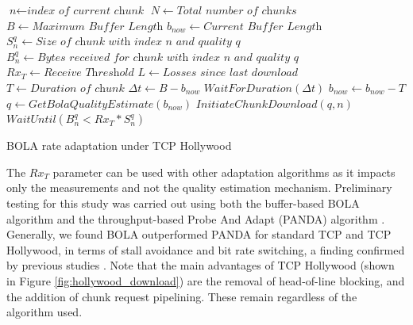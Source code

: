 \begin{algorithm}
	\begin{algorithmic}[1]
		\State $\textit{n} \gets \textit{index of current chunk}$
		\State $N \gets \textit{Total number of chunks}$
		\State $B \gets \textit{Maximum Buffer Length}$
		\State $b_{now} \gets \textit{Current Buffer Length}$
		\State $S_n^q \gets \textit{Size of chunk with index n and quality q}$
		\State $B_n^q  \gets \textit{Bytes received for chunk with index n and quality q }$
		\State $Rx_T \gets \textit{Receive Threshold}$
		\State $L \gets \textit{Losses since last download}$
		\State $T \gets \textit{Duration of chunk}$
				\State $\Delta t \gets B - b_{now}$
				\State $WaitForDuration (\Delta t)$
			\EndIf
				\State $b_{now} \gets b_{now} - T$
			\EndIf
			\State ${q \gets GetBolaQualityEstimate(b_{now})}$		
			\State $InitiateChunkDownload(q, n)$
			\State $WaitUntil (B_n^q < Rx_T * S_n^q)$
		\EndWhile
		\EndProcedure
	\end{algorithmic}
	\caption{BOLA rate adaptation under TCP Hollywood}
	\label{algo:tcph_dash}
\end{algorithm}

The $Rx_{T}$ parameter can be used with other adaptation algorithms as it impacts only the measurements and not the quality estimation mechanism. Preliminary testing for this study was carried out using both the buffer-based BOLA algorithm and the throughput-based Probe And Adapt (PANDA) algorithm \cite{li2014probe}. Generally, we found BOLA outperformed PANDA for standard TCP and TCP Hollywood, in terms of stall avoidance and bit rate switching, a finding confirmed by previous studies \cite{karagkioules2017comparative}. Note that the main advantages of TCP Hollywood (shown in Figure \ref{fig:hollywood_download}) are the removal of head-of-line blocking, and the addition of chunk request pipelining. These remain regardless of the algorithm used. 
